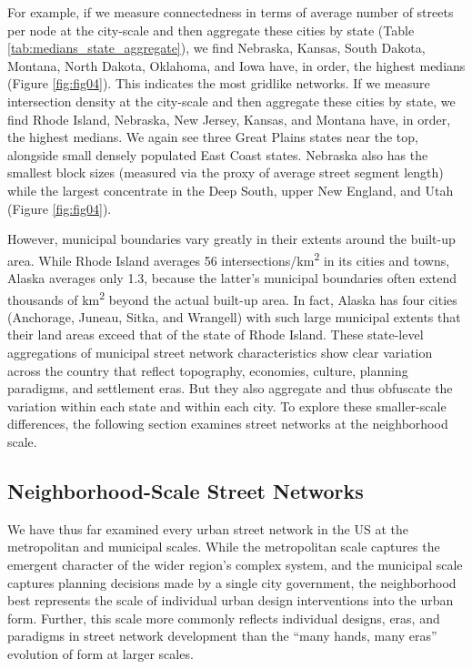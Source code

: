 \documentclass[Afour,sageh,times]{sagej}
\begin{document}
For example, if we measure connectedness in terms of average number of streets per node at the city-scale and then aggregate these cities by state (Table \ref{tab:medians_state_aggregate}), we find Nebraska, Kansas, South Dakota, Montana, North Dakota, Oklahoma, and Iowa have, in order, the highest medians (Figure \ref{fig:fig04}). This indicates the most gridlike networks. If we measure intersection density at the city-scale and then aggregate these cities by state, we find Rhode Island, Nebraska, New Jersey, Kansas, and Montana have, in order, the highest medians. We again see three Great Plains states near the top, alongside small densely populated East Coast states. Nebraska also has the smallest block sizes (measured via the proxy of average street segment length) while the largest concentrate in the Deep South, upper New England, and Utah (Figure \ref{fig:fig04}).

However, municipal boundaries vary greatly in their extents around the built-up area. While Rhode Island averages 56 intersections/km\textsuperscript{2} in its cities and towns, Alaska averages only 1.3, because the latter's municipal boundaries often extend thousands of km\textsuperscript{2} beyond the actual built-up area. In fact, Alaska has four cities (Anchorage, Juneau, Sitka, and Wrangell) with such large municipal extents that their land areas exceed that of the state of Rhode Island. These state-level aggregations of municipal street network characteristics show clear variation across the country that reflect topography, economies, culture, planning paradigms, and settlement eras. But they also aggregate and thus obfuscate the variation within each state and within each city. To explore these smaller-scale differences, the following section examines street networks at the neighborhood scale.



\subsection{Neighborhood-Scale Street Networks}

We have thus far examined every urban street network in the US at the metropolitan and municipal scales. While the metropolitan scale captures the emergent character of the wider region's complex system, and the municipal scale captures planning decisions made by a single city government, the neighborhood best represents the scale of individual urban design interventions into the urban form. Further, this scale more commonly reflects individual designs, eras, and paradigms in street network development than the \enquote{many hands, many eras} evolution of form at larger scales.
\end{document}
